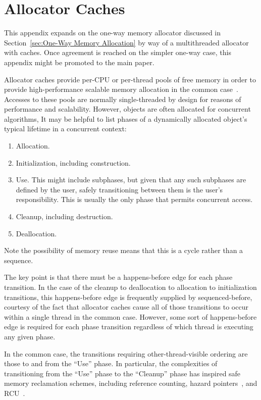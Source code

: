 \documentclass[10]{article}
\begin{document}
\section{Allocator Caches}
\label{sec:Allocator Caches}

This appendix expands on the one-way memory allocator discussed in
Section~\ref{sec:One-Way Memory Allocation}
by way of a multithreaded allocator with caches.
Once agreement is reached on the simpler one-way case, this appendix
might be promoted to the main paper.

Allocator caches provide per-CPU or per-thread pools of free memory
in order to provide high-performance scalable memory allocation in
the common case~\cite{McKenney93,Bonwick94slab}.
Accesses to these pools are normally single-threaded by design for
reasons of performance and scalability.
However, objects are often allocated for concurrent algorithms,
It may be helpful to list phases of a dynamically allocated object's
typical lifetime in a concurrent context:

\begin{enumerate}
\item	Allocation.
\item	Initialization, including construction.
\item	Use.
	This might include subphases, but given that any such
	subphases are defined by the user, safely transitioning between
	them is the user's responsibility.
	This is usually the only phase that permits concurrent access.
\item	Cleanup, including destruction.
\item	Deallocation.
\end{enumerate}

Note the possibility of memory reuse means that this is a cycle rather
than a sequence.

The key point is that there must be a happens-before edge for each
phase transition.
In the case of the cleanup to deallocation to allocation to initialization
transitions, this happens-before edge is frequently supplied by
sequenced-before, courtesy of the fact that allocator caches cause
all of those transitions to occur within a single thread in the common
case.
However, some sort of happens-before edge is required for each phase
transition regardless of which thread is executing any given phase.

In the common case, the transitions requiring other-thread-visible ordering
are those to and from the ``Use'' phase.
In particular, the complexities of transitioning from the ``Use'' phase
to the ``Cleanup'' phase has inspired safe memory reclamation schemes,
including reference counting,
hazard pointers~\cite{Michael02a,HerlihyLM02,MagedMichael04a},
and RCU~\cite{McKenney98}.
\end{document}

